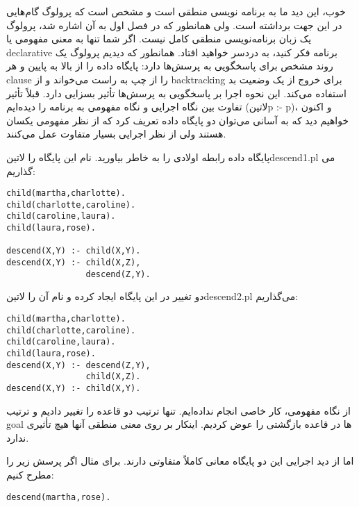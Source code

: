 خوب، این دید ما به برنامه نویسی منطقی است و مشخص است که پرولوگ گام‌هایی در این جهت برداشته است. ولی همانطور که در فصل اول به آن اشاره شد، پرولوگ یک زبان برنامه‌نویسی منطقی کامل نیست. اگر شما تنها به معنی مفهومی یا declarative برنامه فکر کنید، به دردسر خواهید افتاد. همانطور که دیدیم پرولوگ یک روند مشخص برای پاسخگویی به پرسش‌ها دارد: پایگاه داده را از بالا به پایین و هر clause را از چپ به راست می‌خواند و از backtracking برای خروج از یک وضعیت بد استفاده می‌کند. این نحوه اجرا بر پاسخگویی به پرسش‌ها تأثیر بسزایی دارد. قبلاً تأثیر تفاوت بین نگاه اجرایی و نگاه مفهومی به برنامه را دیده‌ایم (‌لاتین{p :- p})، و اکنون خواهیم دید که به آسانی می‌توان دو پایگاه داده تعریف کرد که از نظر مفهومی یکسان هستند ولی از نظر اجرایی بسیار متفاوت عمل می‌کنند.

پایگاه داده رابطه اولادی را به خاطر بیاورید. نام این پایگاه را ‌لاتین{descend1.pl} می گذاریم:

\begin{latin}
\begin{lstlisting}
child(martha,charlotte).
child(charlotte,caroline).
child(caroline,laura).
child(laura,rose).

descend(X,Y) :- child(X,Y).
descend(X,Y) :- child(X,Z),
                descend(Z,Y).
\end{lstlisting}
\end{latin}

دو تغییر در این پایگاه ایجاد کرده و نام آن را ‌لاتین{descend2.pl} می‌گذاریم:

\begin{latin}
\begin{lstlisting}
child(martha,charlotte).
child(charlotte,caroline).
child(caroline,laura).
child(laura,rose).
descend(X,Y) :- descend(Z,Y),
                child(X,Z).
descend(X,Y) :- child(X,Y).
\end{lstlisting}
\end{latin}

از نگاه مفهومی، کار خاصی انجام نداده‌ایم. تنها ترتیب دو قاعده را تغییر دادیم و ترتیب goal ها در قاعده بازگشتی را عوض کردیم. اینکار بر روی معنی منطقی آنها هیچ تأثیری ندارد.

اما از دید اجرایی این دو پایگاه معانی کاملاً  متفاوتی دارند. برای مثال اگر پرسش زیر را مطرح کنیم:

\begin{latin}
\begin{lstlisting}
descend(martha,rose).
\end{lstlisting}
\end{latin}

